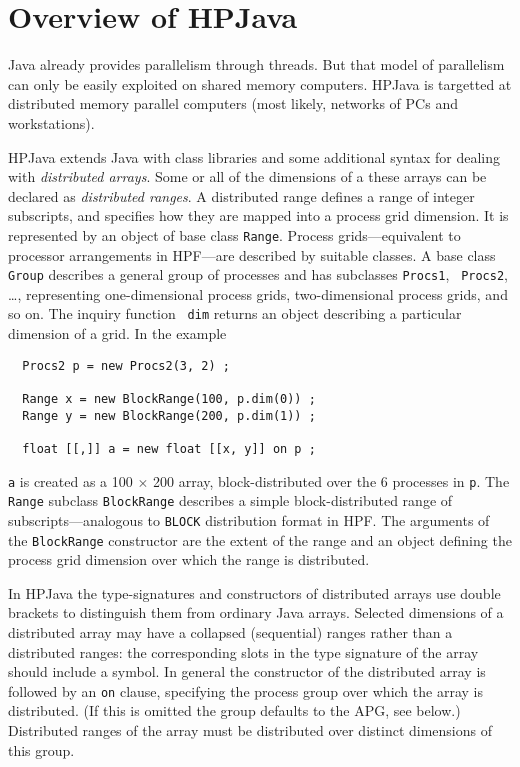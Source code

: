 \section{Overview of HPJava\label{sec:overview}}

Java already provides parallelism through threads.  But that model of
parallelism can only be easily exploited on shared memory computers.
HPJava is targetted at distributed memory parallel computers (most
likely, networks of PCs and workstations).

HPJava extends Java with class libraries and some additional syntax for
dealing with {\em distributed arrays}.  Some or all of the dimensions
of a these arrays can be declared as {\em distributed ranges}.  A
distributed range defines a range of integer subscripts, and specifies
how they are mapped into a process grid dimension.  It is represented
by an object of base class {\tt Range}.
Process grids---equivalent to processor arrangements in HPF---are
described by suitable classes.  A base class {\tt Group} describes a
general group of processes and has subclasses {\tt Procs1}, {\tt
Procs2}, \ldots, representing one-dimensional process grids,
two-dimen\-sional process grids, and so on.  The inquiry function {\tt
dim} returns an object describing a particular dimension of a grid.
In the example
\small
\begin{verbatim}
  Procs2 p = new Procs2(3, 2) ;

  Range x = new BlockRange(100, p.dim(0)) ;
  Range y = new BlockRange(200, p.dim(1)) ;

  float [[,]] a = new float [[x, y]] on p ;
\end{verbatim}
\normalsize
{\tt a} is created as a 100 $\times$ 200 array,
block-distributed over the 6 processes in {\tt p}.
The {\tt Range} subclass {\tt BlockRange} describes a simple
block-distributed range of subscripts---analogous to {\tt BLOCK}
distribution format in HPF.  The arguments of the {\tt BlockRange}
constructor are the extent of the range and an object
defining the process grid dimension over which the range is
distributed.

In HPJava the type-signatures and constructors of distributed arrays
use double brackets to distinguish them from ordinary Java arrays.
Selected dimensions of a distributed array may have a collapsed
(sequential) ranges rather than a distributed ranges: the corresponding
slots in the type signature of the array should include a {\tt *}
symbol.  In general the constructor of the distributed array is
followed by an {\tt on} clause, specifying the process group over which
the array is distributed.  (If this is omitted the group defaults to the
APG, see below.)  Distributed ranges of the array must be distributed
over distinct dimensions of this group.

